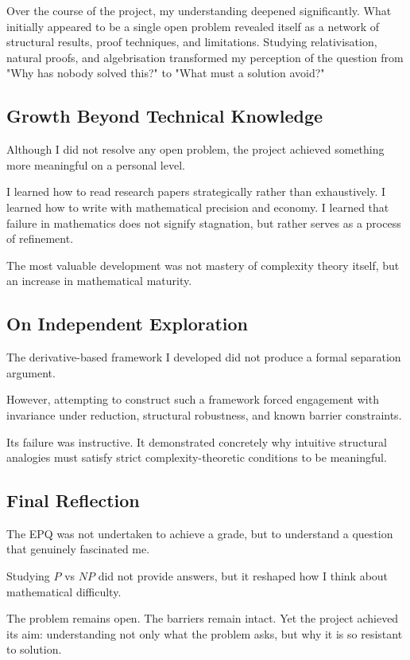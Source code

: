 \documentclass[12pt]{article}
\begin{document}
Over the course of the project, my understanding deepened significantly. What initially appeared to be a single open problem revealed itself as a network of structural results, proof techniques, and limitations. Studying relativisation, natural proofs, and algebrisation transformed my perception of the question from "Why has nobody solved this?" to "What must a solution avoid?"

\subsection*{Growth Beyond Technical Knowledge}

Although I did not resolve any open problem, the project achieved something more meaningful on a personal level.

I learned how to read research papers strategically rather than exhaustively.  
I learned how to write with mathematical precision and economy.  
I learned that failure in mathematics does not signify stagnation, but rather serves as a process of refinement.

The most valuable development was not mastery of complexity theory itself, but an increase in mathematical maturity.

\subsection*{On Independent Exploration}

The derivative-based framework I developed did not produce a formal separation argument.

However, attempting to construct such a framework forced engagement with invariance under reduction, structural robustness, and known barrier constraints.

Its failure was instructive. It demonstrated concretely why intuitive structural analogies must satisfy strict complexity-theoretic conditions to be meaningful.

\subsection*{Final Reflection}
The EPQ was not undertaken to achieve a grade, but to understand a question that genuinely fascinated me.

Studying $P$ vs $NP$ did not provide answers, but it reshaped how I think about mathematical difficulty.

The problem remains open. The barriers remain intact. Yet the project achieved its aim: understanding not only what the problem asks, but why it is so resistant to solution.
\end{document}
